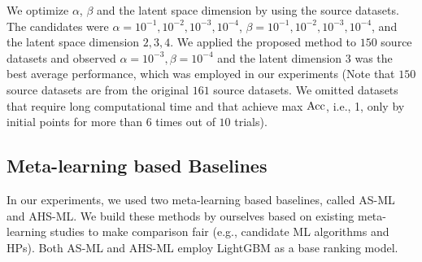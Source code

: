 We optimize $\alpha$, $\beta$ and the latent space dimension by using the source datasets.
%
The candidates were 
$\alpha = 10^{-1}, 10^{-2}, 10^{-3}, 10^{-4}$,
$\beta = 10^{-1}, 10^{-2}, 10^{-3}, 10^{-4}$, and 
the latent space dimension $2, 3, 4$.
%
We applied the proposed method to $150$ source datasets and observed $\alpha=10^{-3}, \beta=10^{-4}$ and the latent dimension $3$ was the best average performance, which was employed in our experiments 
(Note that $150$ source datasets are from the original $161$ source datasets. 
%
We omitted datasets that require long computational time and that achieve max $\mathrm{Acc}$, i.e., 1, only by initial points for more than $6$ times out of $10$ trials).


\subsection{Meta-learning based Baselines}
\label{sapp:compared_method}


In our experiments, we used two meta-learning based baselines, called AS-ML and AHS-ML. 
%
We build these methods by ourselves based on existing meta-learning studies to make comparison fair (e.g., candidate ML algorithms and HPs). 
%
Both AS-ML and AHS-ML employ LightGBM as a base ranking model.

